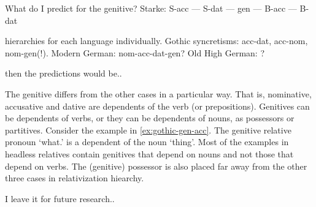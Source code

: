 What do I predict for the genitive? Starke: S-acc --- S-dat --- gen --- B-acc --- B-dat

hierarchies for each language individually. Gothic syncretisms: acc-dat, acc-nom, nom-gen(!). Modern German: nom-acc-dat-gen? Old High German: ?

then the predictions would be..

The genitive differs from the other cases in a particular way. That is, nominative, accusative and dative are dependents of the verb (or prepositions). Genitives can be dependents of verbs, or they can be dependents of nouns, as possessors or partitives. Consider the example in \ref{ex:gothic-gen-acc}. The genitive relative pronoun  `what.' is a dependent of the noun  `thing'. Most of the examples in headless relatives contain genitives that depend on nouns and not those that depend on verbs. The (genitive) possessor is also placed far away from the other three cases in  relativization hiearchy.

I leave it for future research..
